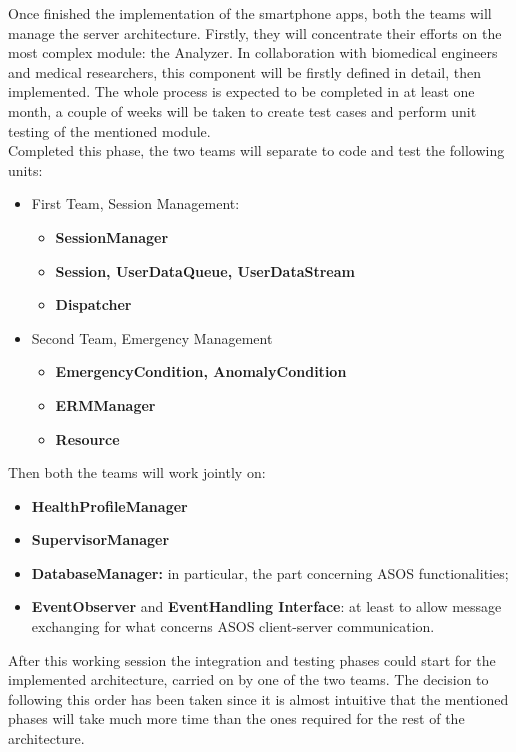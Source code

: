 {{}
Once finished the implementation of the smartphone apps, both the teams will manage the server architecture. Firstly, they will concentrate their efforts on the most complex module: the Analyzer. In collaboration with biomedical engineers and medical researchers, this component will be firstly defined in detail, then implemented. The whole process is expected to be completed in at least one month, a couple of weeks will be taken to create test cases and perform unit testing of the mentioned module.\\
Completed this phase, the two teams will separate to code and test the following units:
\begin{itemize}
	\item {First Team, Session Management:
	\begin{itemize}
		\item \textbf{SessionManager}
		\item \textbf{Session, UserDataQueue, UserDataStream}
		\item \textbf{Dispatcher}
	\end{itemize}}
	\item {Second Team, Emergency Management
	\begin{itemize}
		\item \textbf{EmergencyCondition, AnomalyCondition}
		\item \textbf{ERMManager}
		\item \textbf{Resource}
	\end{itemize}}
\end{itemize}
Then both the teams will work jointly on:
\begin{itemize}[topsep=-0.2em]
	\item \textbf{HealthProfileManager}
	\item \textbf{SupervisorManager}
	\item \textbf{DatabaseManager:} in particular, the part concerning ASOS functionalities;
	\item \textbf{EventObserver} and \textbf{EventHandling Interface}: at least to allow message exchanging for what concerns ASOS client-server communication.
\end{itemize}
After this working session the integration and testing phases could start for the implemented architecture, carried on by one of the two teams. The decision to following this order has been taken since it is almost intuitive that the mentioned phases will take much more time than the ones required for the rest of the architecture.
}
